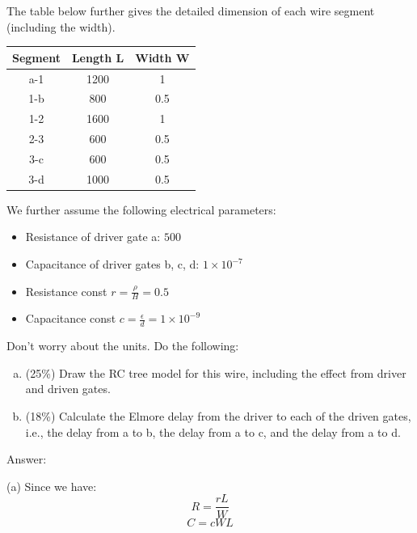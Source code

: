 \documentclass[12pt]{article}
\begin{document}
    \noindent
    The table below further gives the detailed dimension of each wire segment (including the
    width).

    \begin{center}
        \begin{tabular}{|c|c|c|}
            \hline
            Segment & Length L & Width W \\
            \hline
            a-1 & 1200 & 1 \\
            \hline
            1-b & 800 & 0.5 \\
            \hline
            1-2 & 1600 & 1 \\
            \hline
            2-3 & 600 & 0.5 \\
            \hline
            3-c & 600 & 0.5 \\
            \hline
            3-d & 1000 & 0.5 \\
            \hline
        \end{tabular}
    \end{center}

    \noindent
    We further assume the following electrical parameters:
    \begin{itemize}
        \item Resistance of driver gate a: $500$
        \item Capacitance of driver gates b, c, d: $1\times 10^{-7}$
        \item Resistance const $r=\frac{\rho}{H}=0.5$
        \item Capacitance const $c=\frac{\epsilon}{d}=1\times 10^{-9}$
    \end{itemize}

    \noindent
    Don't worry about the units. Do the following:

    \begin{enumerate}[(a)]
    \item (25\%) Draw the RC tree model for this wire, including the effect from driver and
    driven gates.
    \item (18\%) Calculate the Elmore delay from the driver to each of the driven gates, i.e.,
    the delay from a to b, the delay from a to c, and the delay from a to d.
    \end{enumerate}

    \noindent
    Answer:

    \noindent
    (a) Since we have:
    \[R=\frac{rL}{W}\]
    \[C=cWL\]
\end{document}
